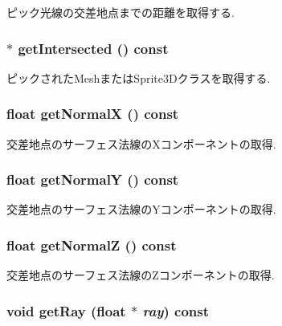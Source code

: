 ピック光線の交差地点までの距離を取得する. \hypertarget{classm3g_1_1RayIntersection_cbf90cea6001c33cc03b5a737b312f62}{
\subsubsection[{getIntersected}]{ $\ast$ getIntersected () const}}
\label{classm3g_1_1RayIntersection_cbf90cea6001c33cc03b5a737b312f62}


ピックされたMeshまたはSprite3Dクラスを取得する. \hypertarget{classm3g_1_1RayIntersection_0ee7a8fab5e001b131bd3109da8af7fa}{
\subsubsection[{getNormalX}]{\setlength{\rightskip}{0pt plus 5cm}float getNormalX () const}}
\label{classm3g_1_1RayIntersection_0ee7a8fab5e001b131bd3109da8af7fa}


交差地点のサーフェス法線のXコンポーネントの取得. \hypertarget{classm3g_1_1RayIntersection_1e05e3b3e8d6b46462812e4713a63d18}{
\subsubsection[{getNormalY}]{\setlength{\rightskip}{0pt plus 5cm}float getNormalY () const}}
\label{classm3g_1_1RayIntersection_1e05e3b3e8d6b46462812e4713a63d18}


交差地点のサーフェス法線のYコンポーネントの取得. \hypertarget{classm3g_1_1RayIntersection_5d0569741397401f53b776f16d08f5c3}{
\subsubsection[{getNormalZ}]{\setlength{\rightskip}{0pt plus 5cm}float getNormalZ () const}}
\label{classm3g_1_1RayIntersection_5d0569741397401f53b776f16d08f5c3}


交差地点のサーフェス法線のZコンポーネントの取得. \hypertarget{classm3g_1_1RayIntersection_3f4d1f2f24c0dadab914014836e1b138}{
\subsubsection[{getRay}]{\setlength{\rightskip}{0pt plus 5cm}void getRay (float $\ast$ {\em ray}) const}}
\label{classm3g_1_1RayIntersection_3f4d1f2f24c0dadab914014836e1b138}


